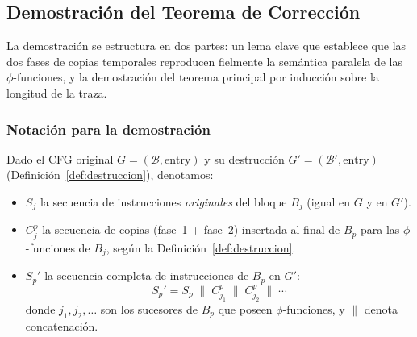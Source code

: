 \documentclass[12pt, a4paper]{article}
\begin{document}
\subsection{Demostración del Teorema de Corrección}

%

La demostración se estructura en dos partes: un lema clave que establece que las dos fases
de copias temporales reproducen fielmente la semántica paralela de las $\phi$-funciones, y
la demostración del teorema principal por inducción sobre la longitud de la traza.

\subsubsection{Notación para la demostración}


Dado el CFG original $G = (\mathcal{B}, \mathrm{entry})$ y su destrucción
$G' = (\mathcal{B}', \mathrm{entry})$ (Definición~\ref{def:destruccion}), denotamos:

\begin{itemize}
  \item $S_j$ la secuencia de instrucciones \emph{originales} del bloque $B_j$ (igual en $G$
    y en $G'$).
  \item $C_j^p$ la secuencia de copias (fase~1 + fase~2) insertada al final de $B_p$ para las
    $\phi$-funciones de $B_j$, según la Definición~\ref{def:destruccion}.
  \item $S_p'$ la secuencia completa de instrucciones de $B_p$ en $G'$:
    \[
      S_p' = S_p \;\|\; C_{j_1}^p \;\|\; C_{j_2}^p \;\|\; \cdots
    \]
    donde $j_1, j_2, \ldots$ son los sucesores de $B_p$ que poseen $\phi$-funciones, y
    $\|$ denota concatenación.
\end{itemize}
\end{document}
